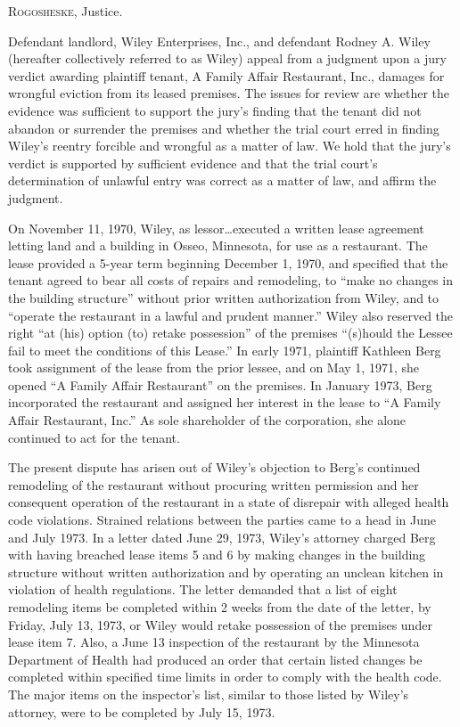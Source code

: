 

\textsc{Rogosheske}, Justice.

Defendant landlord, Wiley Enterprises, Inc., and
defendant Rodney A. Wiley (hereafter collectively
referred to as Wiley) appeal from a judgment upon a
jury verdict awarding plaintiff tenant, A Family Affair Restaurant, Inc.,
damages for wrongful eviction from its leased premises. The issues for review
are whether the evidence was sufficient to support the jury's finding that the
tenant did not abandon or surrender the premises and whether the trial court
erred in finding Wiley's reentry forcible and wrongful
as a matter of law. We hold that the jury's verdict is supported by sufficient
evidence and that the trial court's determination of unlawful entry was correct
as a matter of law, and affirm the judgment.

On November 11, 1970, Wiley, as lessor\ldots executed a
written lease agreement letting land and a building in Osseo, Minnesota, for
use as a restaurant. The lease provided a 5-year term beginning December 1,
1970, and specified that the tenant agreed to bear all costs of repairs and
remodeling, to ``make no changes in the building structure'' without prior
written authorization from Wiley, and to ``operate the
restaurant in a lawful and prudent manner.'' Wiley also
reserved the right ``at (his) option (to) retake possession'' of the premises
``(s)hould the Lessee fail to meet the conditions of this
Lease.'' In early 1971, plaintiff Kathleen
Berg took assignment of the lease from the prior
lessee, and on May 1, 1971, she opened ``A Family Affair Restaurant'' on the
premises. In January 1973, Berg incorporated the
restaurant and assigned her interest in the lease to ``A Family Affair
Restaurant, Inc.'' As sole shareholder of the corporation, she alone continued
to act for the tenant.

The present dispute has arisen out of Wiley's objection
to Berg's continued remodeling of the restaurant
without procuring written permission and her consequent operation of the
restaurant in a state of disrepair with alleged health code violations.
Strained relations between the parties came to a head in June and July 1973. In
a letter dated June 29, 1973, Wiley's attorney charged
Berg with having breached lease items 5 and 6 by making
changes in the building structure without written authorization and by
operating an unclean kitchen in violation of health regulations. The letter
demanded that a list of eight remodeling items be completed within 2 weeks from
the date of the letter, by Friday, July 13, 1973, or
Wiley would retake possession of the premises under
lease item 7. Also, a June 13 inspection of the restaurant by the Minnesota
Department of Health had produced an order that certain listed changes be
completed within specified time limits in order to comply with the health code.
The major items on the inspector's list, similar to those listed by
Wiley's attorney, were to be completed by July 15,
1973.

